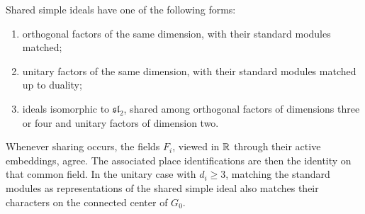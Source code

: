 \begin{lemma}\label{lem:mixed-shared}
Shared simple ideals have one of the following forms:
\begin{enumerate}
\item orthogonal factors of the same dimension, with their standard
  modules matched;
\item unitary factors of the same dimension, with their standard
  modules matched up to duality;
\item ideals isomorphic to $\mathfrak{sl}_2$, shared among orthogonal
  factors of dimensions three or four and unitary factors of
  dimension two.
\end{enumerate}
Whenever sharing occurs, the fields $F_i$, viewed in $\mathbb R$ through
their active embeddings, agree.  The associated place identifications
are then the identity on that common field.  In the unitary case with
$d_i\ge3$, matching the standard modules as representations of the
shared simple ideal also matches their characters on the connected
center of $G_0$.
\end{lemma}

